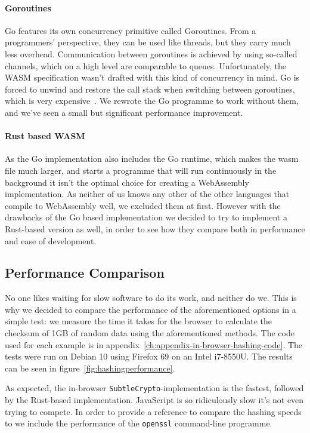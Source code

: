 \paragraph{Goroutines} Go features its own concurrency primitive called Goroutines.
From a programmers' perspective, they can be used like threads, but they carry much less overhead.
Communication between goroutines is achieved by using so-called channels, which on a high level are comparable to queues.
Unfortunately, the \gls{WASM} specification wasn't drafted with this kind of concurrency in mind.
Go is forced to unwind and restore the call stack when switching between goroutines, which is very expensive~\cite{lolnogoroutines}.
We rewrote the Go programme to work without them, and we've seen a small but significant performance improvement.

\paragraph{Rust based WASM}
As the Go implementation also includes the Go runtime,
which makes the wasm file much larger,
and starts a programme that will run continuously in the background it isn't the optimal choice for creating a WebAssembly implementation.
As neither of us knows any other of the other languages that compile to WebAssembly well, we excluded them at first.
However with the drawbacks of the Go based implementation we decided to try to implement a Rust-based version as well,
in order to see how they compare both in performance and ease of development.


\subsection{Performance Comparison}
\label{subsec:perfcomphashing}
No one likes waiting for slow software to do its work, and neither do we.
This is why we decided to compare the performance of the aforementioned options in a simple test:
we measure the time it takes for the browser to calculate the checksum of 1GB of random data using the aforementioned methods.
The code used for each example is in appendix~\ref{ch:appendix-in-browser-hashing-code}.
The tests were run on Debian 10 using Firefox 69 on an Intel i7-8550U.
The results can be seen in figure~\ref{fig:hashingperformance}.

As expected, the in-browser \texttt{SubtleCrypto}-implementation is the fastest, followed by the Rust-based implementation.
JavaScript is so ridiculously slow it's not even trying to compete.
In order to provide a reference to compare the hashing speeds to we include the performance of the \texttt{openssl} command-line programme.

